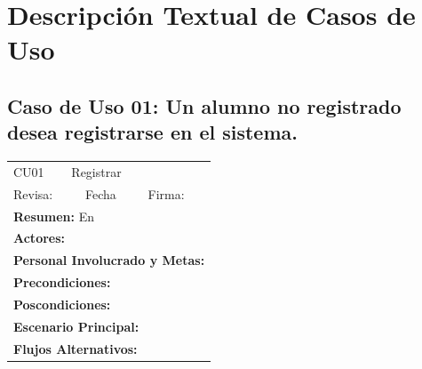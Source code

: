 \section{Descripción Textual de Casos de Uso}


\subsection{Caso de Uso 01: Un alumno no registrado desea registrarse en el sistema.}

\begin{longtable}{|l|p{5.5cm}|l|p{2cm}|l|p{1.9cm}|} \hline
    \cellcolor{grisOscuro} CU01 & \multicolumn{4}{|l|}{  \cellcolor{grisOscuro} Registrar} &  \cellcolor{grisClaro}\multirow{2}{1cm}{} \\ \cline{1-5}
    \cellcolor{grisOscuro} Revisa: &  \cellcolor{grisClaro} &  \cellcolor{grisOscuro} Fecha &  \cellcolor{grisClaro} &  \cellcolor{grisOscuro} Firma: & \cellcolor{grisClaro} \\ \hline
    \multicolumn{6}{|p{15cm}|}{ \textbf{Resumen: } En

    } \\ \hline

    \multicolumn{6}{|p{15cm}|}{ \textbf{Actores: }

    } \\ \hline

    \multicolumn{6}{|p{15cm}|}{ \textbf{Personal Involucrado y Metas: }

    } \\ \hline

    \multicolumn{6}{|p{15cm}|}{ \textbf{Precondiciones: }

    } \\ \hline

    \multicolumn{6}{|p{15cm}|}{ \textbf{Poscondiciones: }

    } \\ \hline

    \multicolumn{6}{|p{15cm}|}{ \textbf{Escenario Principal: }

    } \\ \hline

    \multicolumn{6}{|p{15cm}|}{ \textbf{Flujos Alternativos: }

    } \\ \hline

\end{longtable}



